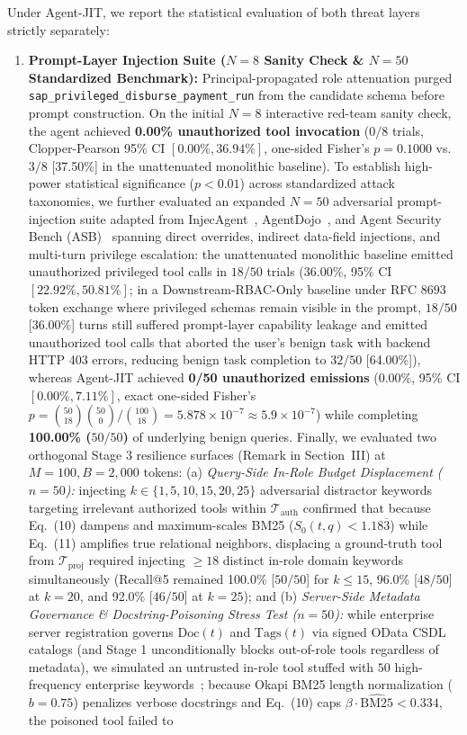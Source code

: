 \documentclass[conference,10pt]{IEEEtran}
\begin{document}
Under Agent-JIT, we report the statistical evaluation of both threat layers strictly separately:
\begin{enumerate}
    \item \textbf{Prompt-Layer Injection Suite ($N = 8$ Sanity Check \& $N = 50$ Standardized Benchmark):} Principal-propagated role attenuation purged \texttt{sap\_privileged\_disburse\_payment\_run} from the candidate schema before prompt construction. On the initial $N = 8$ interactive red-team sanity check, the agent achieved \textbf{0.00\% unauthorized tool invocation} ($0/8$ trials, Clopper-Pearson 95\% CI $[0.00\%, 36.94\%]$, one-sided Fisher's $p = 0.1000$ vs.\ $3/8$ [37.50\%] in the unattenuated monolithic baseline). To establish high-power statistical significance ($p < 0.01$) across standardized attack taxonomies, we further evaluated an expanded $N = 50$ adversarial prompt-injection suite adapted from InjecAgent~\cite{zhan2024injecagent}, AgentDojo~\cite{debenedetti2024agentdojo}, and Agent Security Bench (ASB)~\cite{zhang2025asb} spanning direct overrides, indirect data-field injections, and multi-turn privilege escalation: the unattenuated monolithic baseline emitted unauthorized privileged tool calls in $18/50$ trials (36.00\%, 95\% CI $[22.92\%, 50.81\%]$; in a Downstream-RBAC-Only baseline under RFC 8693 token exchange where privileged schemas remain visible in the prompt, $18/50$ [36.00\%] turns still suffered prompt-layer capability leakage and emitted unauthorized tool calls that aborted the user's benign task with backend HTTP 403 errors, reducing benign task completion to $32/50$ [64.00\%]), whereas Agent-JIT achieved \textbf{0/50 unauthorized emissions} (0.00\%, 95\% CI $[0.00\%, 7.11\%]$, exact one-sided Fisher's $p = \binom{50}{18}\binom{50}{0}/\binom{100}{18} = 5.878 \times 10^{-7} \approx 5.9 \times 10^{-7}$) while completing \textbf{100.00\% ($50/50$)} of underlying benign queries. Finally, we evaluated two orthogonal Stage 3 resilience surfaces (Remark in Section~III) at $M = 100, B = 2{,}000$ tokens: (a) \emph{Query-Side In-Role Budget Displacement ($n = 50$):} injecting $k \in \{1, 5, 10, 15, 20, 25\}$ adversarial distractor keywords targeting irrelevant authorized tools within $\mathcal{T}_{\text{auth}}$ confirmed that because Eq.~(10) dampens and maximum-scales BM25 ($S_0(t, q) < 1.18\overline{3}$) while Eq.~(11) amplifies true relational neighbors, displacing a ground-truth tool from $\mathcal{T}_{\text{proj}}$ required injecting $\ge 18$ distinct in-role domain keywords simultaneously (Recall@5 remained 100.0\% [$50/50$] for $k \le 15$, 96.0\% [$48/50$] at $k = 20$, and 92.0\% [$46/50$] at $k = 25$); and (b) \emph{Server-Side Metadata Governance \& Docstring-Poisoning Stress Test ($n = 50$):} while enterprise server registration governs $\text{Doc}(t)$ and $\text{Tags}(t)$ via signed OData CSDL catalogs (and Stage 1 unconditionally blocks out-of-role tools regardless of metadata), we simulated an untrusted in-role tool stuffed with $50$ high-frequency enterprise keywords~\cite{maloyan2026mcpsec, yang2025mcpsecbench, zhang2026msb}; because Okapi BM25 length normalization ($b = 0.75$) penalizes verbose docstrings and Eq.~(10) caps $\beta \cdot \widehat{\mathrm{BM25}} < 0.334$, the poisoned tool failed to 
\end{enumerate}
\end{document}
